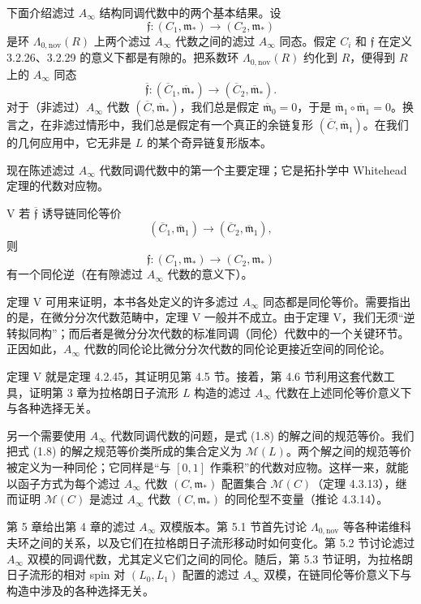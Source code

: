 下面介绍滤过 $A_\infty$ 结构同调代数中的两个基本结果。设
\[
  \mathfrak f\colon(C_1,\mathfrak m_*)
  \longrightarrow(C_2,\mathfrak m_*)
\]
是环 $\Lambda_{0,\mathrm{nov}}(R)$ 上两个滤过 $A_\infty$ 代数之间的滤过 $A_\infty$ 同态。假定 $C_i$ 和 $\mathfrak f$ 在定义 3.2.26、3.2.29 的意义下都是有隙的。把系数环 $\Lambda_{0,\mathrm{nov}}(R)$ 约化到 $R$，便得到 $R$ 上的 $A_\infty$ 同态
\[
  \overline{\mathfrak f}\colon
  (\overline C_1,\overline{\mathfrak m}_*)
  \longrightarrow
  (\overline C_2,\overline{\mathfrak m}_*).
\]
对于（非滤过）$A_\infty$ 代数 $(\overline C,\overline{\mathfrak m}_*)$，我们总是假定 $\overline{\mathfrak m}_0=0$，于是
$\overline{\mathfrak m}_1\circ\overline{\mathfrak m}_1=0$。换言之，在非滤过情形中，我们总是假定有一个真正的余链复形 $(\overline C,\overline{\mathfrak m}_1)$。在我们的几何应用中，它无非是 $L$ 的某个奇异链复形版本。

现在陈述滤过 $A_\infty$ 代数同调代数中的第一个主要定理；它是拓扑学中
Whitehead 定理的代数对应物。

\begin{theorem}{V}\label{thm:intro-V}
若 $\overline{\mathfrak f}$ 诱导链同伦等价
\[
  (\overline C_1,\overline{\mathfrak m}_1)
  \longrightarrow
  (\overline C_2,\overline{\mathfrak m}_1),
\]
则
\[
  \mathfrak f\colon(C_1,\mathfrak m_*)
  \longrightarrow(C_2,\mathfrak m_*)
\]
有一个同伦逆（在有隙滤过 $A_\infty$ 代数的意义下）。
\end{theorem}

定理 V 可用来证明，本书各处定义的许多滤过 $A_\infty$ 同态都是同伦等价。需要指出的是，在微分分次代数范畴中，定理 V 一般并不成立。由于定理 V，我们无须“逆转拟同构”；而后者是微分分次代数的标准同调（同伦）代数中的一个关键环节。正因如此，$A_\infty$ 代数的同伦论比微分分次代数的同伦论更接近空间的同伦论。

定理 V 就是定理 4.2.45，其证明见第 4.5 节。接着，第 4.6 节利用这套代数工具，证明第 3 章为拉格朗日子流形 $L$ 构造的滤过 $A_\infty$ 代数在上述同伦等价意义下与各种选择无关。

另一个需要使用 $A_\infty$ 代数同调代数的问题，是式 (1.8) 的解之间的规范等价。我们把式 (1.8) 的解之规范等价类所成的集合定义为 $\mathcal M(L)$。两个解之间的规范等价被定义为一种同伦；它同样是“与 $[0,1]$ 作乘积”的代数对应物。这样一来，就能以函子方式为每个滤过 $A_\infty$ 代数 $(C,\mathfrak m_*)$ 配置集合 $\mathcal M(C)$（定理 4.3.13），继而证明 $\mathcal M(C)$ 是滤过 $A_\infty$ 代数 $(C,\mathfrak m_*)$ 的同伦型不变量（推论 4.3.14）。

第 5 章给出第 4 章的滤过 $A_\infty$ 双模版本。第 5.1 节首先讨论 $\Lambda_{0,\mathrm{nov}}$ 等各种诺维科夫环之间的关系，以及它们在拉格朗日子流形移动时如何变化。第 5.2 节讨论滤过 $A_\infty$ 双模的同调代数，尤其定义它们之间的同伦。随后，第 5.3 节证明，为拉格朗日子流形的相对 spin 对 $(L_0,L_1)$ 配置的滤过 $A_\infty$ 双模，在链同伦等价意义下与构造中涉及的各种选择无关。

